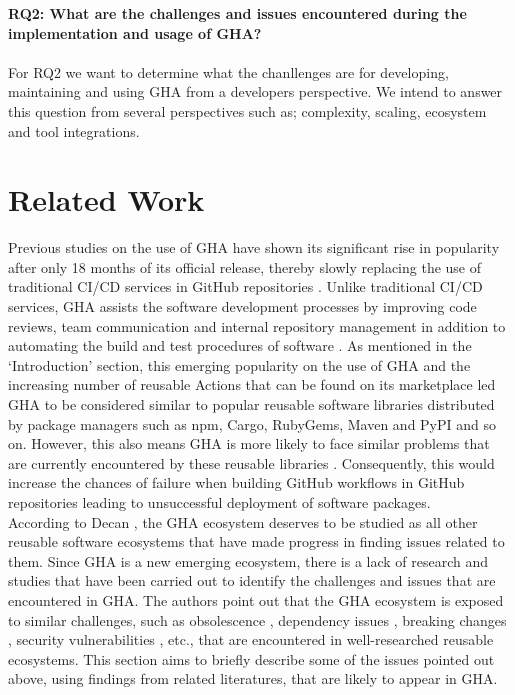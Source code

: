 \documentclass[conference]{IEEEtran}
\begin{document}
     \textbf{RQ2: What are the challenges and issues encountered during the implementation and usage of GHA?}\\
\\
For RQ2 we want to determine what the chanllenges are for developing, maintaining and using GHA from a developers perspective. We intend to answer this question from several perspectives such as; complexity, scaling, ecosystem and tool integrations.


\section{Related Work}
Previous studies on the use of GHA have shown its significant rise in popularity after only 18 months of its official release, thereby slowly replacing the use of traditional CI/CD services in GitHub repositories \cite{golzadeh2021rise}. Unlike traditional CI/CD services, GHA assists the software development processes by improving code reviews, team communication and internal repository management in addition to automating the build and test procedures of software \cite{chandrasekara2021hands}. As mentioned in the ‘Introduction’ section, this emerging popularity on the use of GHA and the increasing number of reusable Actions that can be found on its marketplace led GHA to be considered similar to popular reusable software libraries distributed by package managers such as npm, Cargo, RubyGems, Maven and PyPI and so on. However, this also means GHA is more likely to face similar problems that are currently encountered by these reusable libraries \cite{decan2022use}. Consequently, this would increase the chances of failure when building GitHub workflows in GitHub repositories leading to unsuccessful deployment of software packages. 
\\

According to Decan \cite{decan2022use}, the GHA ecosystem deserves to be studied as all other reusable software ecosystems that have made progress in finding issues related to them. Since GHA is a new emerging ecosystem, there is a lack of research and studies that have been carried out to identify the challenges and issues that are encountered in GHA. The authors point out that the GHA ecosystem is exposed to similar challenges, such as obsolescence \cite{decan2018evolution} \cite{cogo2021deprecation}, dependency issues \cite{decan2019empirical} \cite{soto2021comprehensive} \cite{decan2019package}, breaking changes \cite{dietrich2019dependency}\cite{decan2018impact}, security vulnerabilities \cite{zimmermann2019small} \cite{kula2018developers}, etc., that are encountered in well-researched reusable ecosystems. This section aims to briefly describe some of the issues pointed out above, using findings from related literatures, that are likely to appear in GHA.
\end{document}
